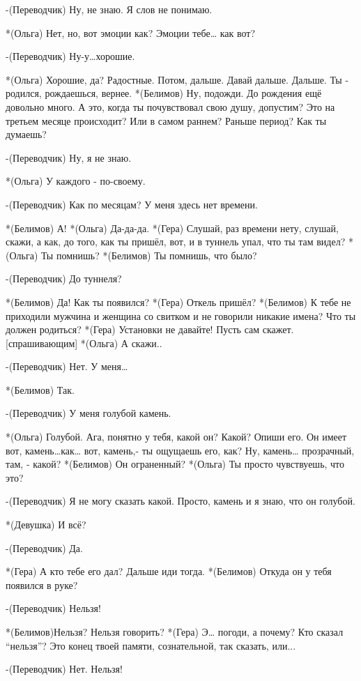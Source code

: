 -(Переводчик) Ну, не знаю. Я слов не понимаю.

*(Ольга) Нет, но, вот эмоции как? Эмоции тебе… как вот?

-(Переводчик) Ну-у…хорошие.

*(Ольга) Хорошие, да? Радостные. Потом, дальше. Давай дальше. Дальше. Ты - родился, рождаешься, вернее.
*(Белимов) Ну, подожди. До рождения ещё довольно много. А это, когда ты почувствовал свою душу, допустим? Это на третьем месяце происходит? Или в самом раннем?  Раньше период? Как ты думаешь?

-(Переводчик) Ну, я не знаю.

*(Ольга) У каждого -  по-своему.

-(Переводчик) Как по месяцам? У меня здесь нет времени.

*(Белимов) А!
*(Ольга) Да-да-да.
*(Гера) Слушай, раз времени нету, слушай, скажи, а как, до того, как ты пришёл, вот,  и в туннель упал, что ты там видел?
*(Ольга) Ты помнишь?
*(Белимов) Ты помнишь, что было?

-(Переводчик) До туннеля?

*(Белимов) Да! Как ты появился?
*(Гера) Откель пришёл?
*(Белимов) К тебе не приходили мужчина и женщина со свитком и не говорили никакие имена? Что ты должен родиться?
*(Гера) Установки не давайте! Пусть сам скажет. [спрашивающим]
*(Ольга) А скажи..

-(Переводчик) Нет. У меня…

*(Белимов) Так.

-(Переводчик) У меня голубой камень.

*(Ольга) Голубой. Ага, понятно у тебя, какой он? Какой? Опиши его. Он имеет вот, камень…как… вот, камень,- ты ощущаешь его, как? Ну, камень… прозрачный, там, - какой? 
*(Белимов) Он ограненный?
*(Ольга) Ты просто чувствуешь, что это?

-(Переводчик) Я не могу сказать какой. Просто, камень и я знаю, что он голубой. 

*(Девушка) И всё?

-(Переводчик) Да.

*(Гера) А кто тебе его дал? Дальше иди тогда.
*(Белимов) Откуда он у тебя появился в руке?

-(Переводчик) Нельзя!

*(Белимов)Нельзя? Нельзя говорить?
*(Гера) Э… погоди, а почему? Кто сказал “нельзя”? Это конец твоей памяти, сознательной, так сказать, или...

-(Переводчик) Нет. Нельзя!

